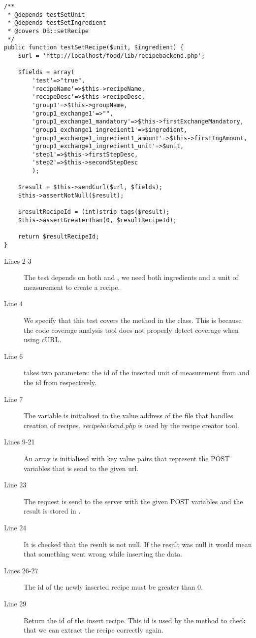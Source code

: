 \begin{lstlisting}[language=phpstyle]
/**
 * @depends testSetUnit
 * @depends testSetIngredient
 * @covers DB::setRecipe
 */
public function testSetRecipe($unit, $ingredient) {
    $url = 'http://localhost/food/lib/recipebackend.php';

    $fields = array(
        'test'=>"true",
        'recipeName'=>$this->recipeName,
        'recipeDesc'=>$this->recipeDesc,
        'group1'=>$this->groupName,
        'group1_exchange1'=>"",
        'group1_exchange1_mandatory'=>$this->firstExchangeMandatory,
        'group1_exchange1_ingredient1'=>$ingredient,
        'group1_exchange1_ingredient1_amount'=>$this->firstIngAmount,
        'group1_exchange1_ingredient1_unit'=>$unit,
        'step1'=>$this->firstStepDesc,
        'step2'=>$this->secondStepDesc
        );
    
    $result = $this->sendCurl($url, $fields);
    $this->assertNotNull($result);
        
    $resultRecipeId = (int)strip_tags($result);
    $this->assertGreaterThan(0, $resultRecipeId);
    
    return $resultRecipeId;
}
\end{lstlisting}

\begin{description}
\item[Lines 2-3] The test depends on both  and , we need both ingredients and a unit of measurement to create a recipe.
\item[Line 4] We specify that this test covers the  method in the  class. This is because the code coverage analysis tool does not properly detect coverage when using cURL\cite{curl}.
\item[Line 6]  takes two parameters: the id of the inserted unit of measurement from  and the id from  respectively.
\item[Line 7] The  variable is initialised to the value address of the file that handles creation of recipes. \textit{recipebackend.php} is used by the recipe creator tool.%
\item[Lines 9-21] An array is initialised with key value pairs that represent the POST variables that is send to the given url.
\item[Line 23] The request is send to the server with the given POST variables and the result is stored in .%
\item[Line 24] It is checked that the result is not null. If the result was null it would mean that something went wrong while inserting the data.
\item[Lines 26-27] The id of the newly inserted recipe must be greater than 0.
\item[Line 29] Return the id of the insert recipe. This id is used by the  method to check that we can extract the recipe correctly again.
\end{description}

